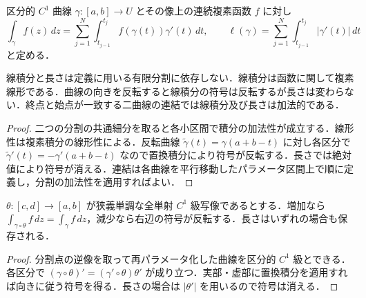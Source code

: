 \begin{defn}[複素線積分と曲線の長さ]
区分的 $C^1$ 曲線 $\gamma:[a,b]\to U$ とその像上の連続複素函数 $f$ に対し
\[
\int_\gamma f(z)\,dz=\sum_{j=1}^N\int_{t_{j-1}}^{t_j}f(\gamma(t))\gamma'(t)\,dt,\qquad
\ell(\gamma)=\sum_{j=1}^N\int_{t_{j-1}}^{t_j}|\gamma'(t)|\,dt
\]
と定める．
\end{defn}
\begin{prop}[線積分の分割・反転・連結]
線積分と長さは定義に用いる有限分割に依存しない．線積分は函数に関して複素線形である．曲線の向きを反転すると線積分の符号は反転するが長さは変わらない．終点と始点が一致する二曲線の連結では線積分及び長さは加法的である．
\end{prop}
\begin{proof}
二つの分割の共通細分を取ると各小区間で積分の加法性が成立する．線形性は複素積分の線形性による．反転曲線 $\tilde\gamma(t)=\gamma(a+b-t)$ に対し各区分で $\tilde\gamma'(t)=-\gamma'(a+b-t)$ なので置換積分により符号が反転する．長さでは絶対値により符号が消える．連結は各曲線を平行移動したパラメータ区間上で順に定義し，分割の加法性を適用すればよい．
\end{proof}
\begin{prop}[線積分の再パラメータ化]
$\theta:[c,d]\to[a,b]$ が狭義単調な全単射 $C^1$ 級写像であるとする．増加なら $\int_{\gamma\circ\theta}f\,dz=\int_\gamma f\,dz$，減少なら右辺の符号が反転する．長さはいずれの場合も保存される．
\end{prop}
\begin{proof}
分割点の逆像を取って再パラメータ化した曲線を区分的 $C^1$ 級とできる．各区分で $(\gamma\circ\theta)'=(\gamma'\circ\theta)\theta'$ が成り立つ．実部・虚部に置換積分を適用すれば向きに従う符号を得る．長さの場合は $|\theta'|$ を用いるので符号は消える．
\end{proof}
